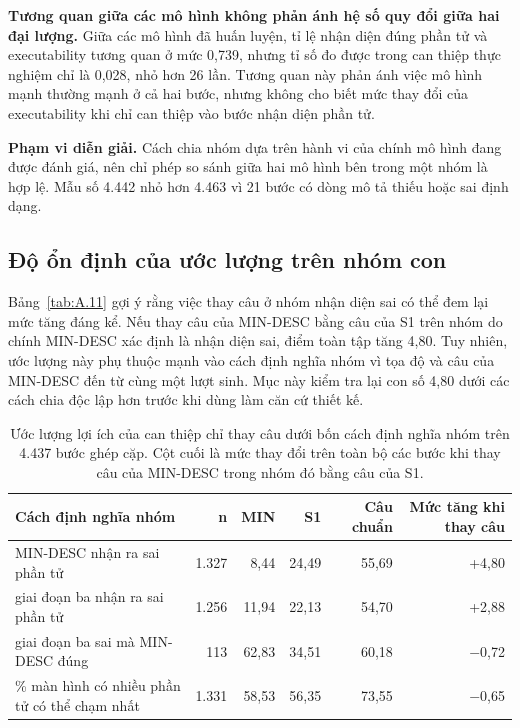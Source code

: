 \textbf{Tương quan giữa các mô hình không phản ánh hệ số quy đổi giữa hai đại lượng.} Giữa các mô hình đã huấn luyện, tỉ lệ nhận diện đúng phần tử và executability tương quan ở mức 0,739, nhưng tỉ số đo được trong can thiệp thực nghiệm chỉ là 0,028, nhỏ hơn 26 lần. Tương quan này phản ánh việc mô hình mạnh thường mạnh ở cả hai bước, nhưng không cho biết mức thay đổi của executability khi chỉ can thiệp vào bước nhận diện phần tử.

\textbf{Phạm vi diễn giải.} Cách chia nhóm dựa trên hành vi của chính mô hình đang được đánh giá, nên chỉ phép so sánh giữa hai mô hình bên trong một nhóm là hợp lệ. Mẫu số 4.442 nhỏ hơn 4.463 vì 21 bước có dòng mô tả thiếu hoặc sai định dạng.

\subsection{Độ ổn định của ước lượng trên nhóm con}\label{sec:A.5.1}

Bảng~\ref{tab:A.11} gợi ý rằng việc thay câu ở nhóm nhận diện sai có thể đem lại mức tăng đáng kể. Nếu thay câu của MIN-DESC bằng câu của S1 trên nhóm do chính MIN-DESC xác định là nhận diện sai, điểm toàn tập tăng 4,80. Tuy nhiên, ước lượng này phụ thuộc mạnh vào cách định nghĩa nhóm vì tọa độ và câu của MIN-DESC đến từ cùng một lượt sinh. Mục này kiểm tra lại con số 4,80 dưới các cách chia độc lập hơn trước khi dùng làm căn cứ thiết kế.

\begin{table}[htbp]
\centering\footnotesize
\caption[Ước lượng lợi ích của can thiệp chỉ thay câu dưới bốn cách định nghĩa nhóm.]{Ước lượng lợi ích của can thiệp chỉ thay câu dưới bốn cách định nghĩa nhóm trên 4.437 bước ghép cặp. Cột cuối là mức thay đổi trên toàn bộ các bước khi thay câu của MIN-DESC trong nhóm đó bằng câu của S1.}\label{tab:A.13}
\begin{tabularx}{\textwidth}{@{}>{\raggedright\arraybackslash}Xrrrrr@{}}
\toprule
\textbf{Cách định nghĩa nhóm} & \textbf{n} & \textbf{MIN} & \textbf{S1} & \textbf{Câu chuẩn} & \textbf{Mức tăng khi thay câu} \\
\midrule
MIN-DESC nhận ra sai phần tử & 1.327 & 8,44 & 24,49 & 55,69 & +4,80 \\
giai đoạn ba nhận ra sai phần tử & 1.256 & 11,94 & 22,13 & 54,70 & +2,88 \\
giai đoạn ba sai mà MIN-DESC đúng & 113 & 62,83 & 34,51 & 60,18 & $-$0,72 \\
30\% màn hình có nhiều phần tử có thể chạm nhất & 1.331 & 58,53 & 56,35 & 73,55 & $-$0,65 \\
\bottomrule
\end{tabularx}
\end{table}

